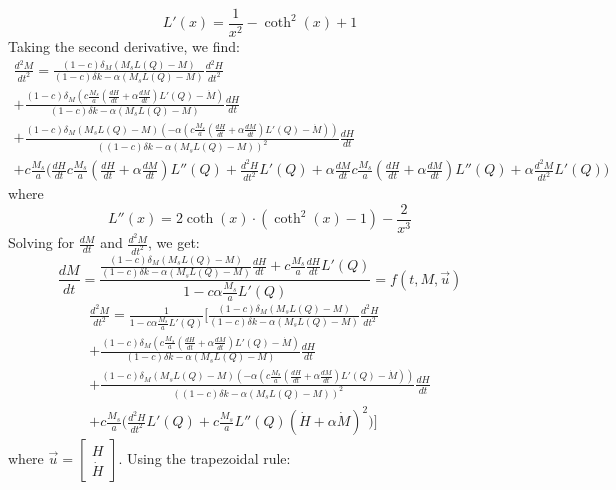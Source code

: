 \documentclass[twoside,a4paper]{article}
\begin{document}
\begin{equation}
    L'(x) = \frac{1}{x^2} - \coth^2(x) + 1
\end{equation}
%
Taking the second derivative, we find:
\begin{multline}
    \frac{d^2 M}{dt^2} = \frac{(1-c) \delta_M (M_sL(Q) - M)}{(1-c) \delta k - \alpha (M_sL(Q) - M)} \frac{d^2H}{dt^2}\\
     + \frac{(1-c) \delta_M (c \frac{M_s}{a} (\frac{dH}{dt} + \alpha \frac{dM}{dt}) L'(Q) - \dot{M})}{(1-c) \delta k - \alpha (M_sL(Q) - M)} \frac{dH}{dt}\\
     + \frac{(1-c) \delta_M (M_sL(Q) - M)(-\alpha (c \frac{M_s}{a} (\frac{dH}{dt} + \alpha \frac{dM}{dt}) L'(Q) - \dot{M}))}{((1-c) \delta k - \alpha (M_sL(Q) - M))^2} \frac{dH}{dt}\\
     + c \frac{M_s}{a} \Big(\frac{dH}{dt} c \frac{M_s}{a} (\frac{dH}{dt} + \alpha \frac{dM}{dt}) L''(Q) + \frac{d^2H}{dt^2} L'(Q) + \alpha \frac{dM}{dt} c \frac{M_s}{a} (\frac{dH}{dt} + \alpha \frac{dM}{dt}) L''(Q) + \alpha \frac{d^2M}{dt^2} L'(Q) \Big)
\end{multline}
%
where
\begin{equation}
    L''(x) = 2 \coth(x) \cdot (\coth^2(x) - 1) - \frac{2}{x^3}
\end{equation}
%
Solving for $\frac{dM}{dt}$ and $\frac{d^2M}{dt^2}$, we get:
\begin{equation}
    \frac{dM}{dt} = \frac{\frac{(1-c) \delta_M (M_sL(Q) - M)}{(1-c) \delta k - \alpha (M_sL(Q) - M)} \frac{dH}{dt} + c \frac{M_s}{a} \frac{dH}{dt} L'(Q)}{1 - c \alpha \frac{M_s}{a} L'(Q)} = f(t, M, \vec{u})
\end{equation}
\begin{multline}
    \frac{d^2 M}{dt^2} = \frac{1}{1 - c \alpha \frac{M_s}{a} L'(Q)} \Bigg[
\frac{(1-c) \delta_M (M_sL(Q) - M)}{(1-c) \delta k - \alpha (M_sL(Q) - M)} \frac{d^2H}{dt^2}\\
+ \frac{(1-c) \delta_M (c \frac{M_s}{a} (\frac{dH}{dt} + \alpha \frac{dM}{dt}) L'(Q) - \dot{M})}{(1-c) \delta k - \alpha (M_sL(Q) - M)} \frac{dH}{dt}\\
+ \frac{(1-c) \delta_M (M_sL(Q) - M)(-\alpha (c \frac{M_s}{a} (\frac{dH}{dt} + \alpha \frac{dM}{dt}) L'(Q) - \dot{M}))}{((1-c) \delta k - \alpha (M_sL(Q) - M))^2} \frac{dH}{dt}\\
+ c \frac{M_s}{a} \Big(\frac{d^2H}{dt^2} L'(Q) + c \frac{M_s}{a} L''(Q) (\dot{H} + \alpha \dot{M})^2 \Big) \Bigg]
\end{multline}
%
where $\vec{u} = \begin{bmatrix}
    H \\
    \dot{H}
    \end{bmatrix}$.
\newline\newline
Using the trapezoidal rule:
\end{document}
